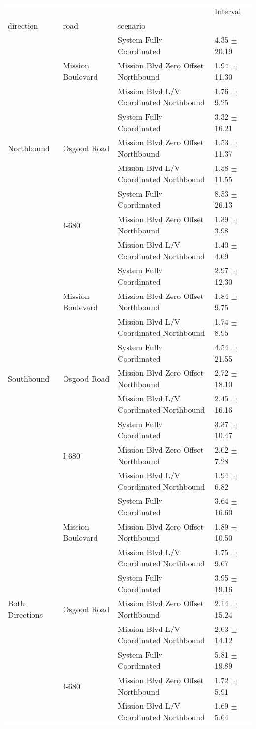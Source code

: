 \begin{tabular}{llll}
\toprule
 &  &  & Interval \\
direction & road & scenario &  \\
\midrule
\multirow[t]{9}{*}{Northbound} & \multirow[t]{3}{*}{Mission Boulevard} & System Fully Coordinated & 4.35 $\pm$ 20.19 \\
 &  & Mission Blvd Zero Offset Northbound & 1.94 $\pm$ 11.30 \\
 &  & Mission Blvd L/V Coordinated Northbound & 1.76 $\pm$ 9.25 \\
 & \multirow[t]{3}{*}{Osgood Road} & System Fully Coordinated & 3.32 $\pm$ 16.21 \\
 &  & Mission Blvd Zero Offset Northbound & 1.53 $\pm$ 11.37 \\
 &  & Mission Blvd L/V Coordinated Northbound & 1.58 $\pm$ 11.55 \\
 & \multirow[t]{3}{*}{I-680} & System Fully Coordinated & 8.53 $\pm$ 26.13 \\
 &  & Mission Blvd Zero Offset Northbound & 1.39 $\pm$ 3.98 \\
 &  & Mission Blvd L/V Coordinated Northbound & 1.40 $\pm$ 4.09 \\
\multirow[t]{9}{*}{Southbound} & \multirow[t]{3}{*}{Mission Boulevard} & System Fully Coordinated & 2.97 $\pm$ 12.30 \\
 &  & Mission Blvd Zero Offset Northbound & 1.84 $\pm$ 9.75 \\
 &  & Mission Blvd L/V Coordinated Northbound & 1.74 $\pm$ 8.95 \\
 & \multirow[t]{3}{*}{Osgood Road} & System Fully Coordinated & 4.54 $\pm$ 21.55 \\
 &  & Mission Blvd Zero Offset Northbound & 2.72 $\pm$ 18.10 \\
 &  & Mission Blvd L/V Coordinated Northbound & 2.45 $\pm$ 16.16 \\
 & \multirow[t]{3}{*}{I-680} & System Fully Coordinated & 3.37 $\pm$ 10.47 \\
 &  & Mission Blvd Zero Offset Northbound & 2.02 $\pm$ 7.28 \\
 &  & Mission Blvd L/V Coordinated Northbound & 1.94 $\pm$ 6.82 \\
\multirow[t]{9}{*}{Both Directions} & \multirow[t]{3}{*}{Mission Boulevard} & System Fully Coordinated & 3.64 $\pm$ 16.60 \\
 &  & Mission Blvd Zero Offset Northbound & 1.89 $\pm$ 10.50 \\
 &  & Mission Blvd L/V Coordinated Northbound & 1.75 $\pm$ 9.07 \\
 & \multirow[t]{3}{*}{Osgood Road} & System Fully Coordinated & 3.95 $\pm$ 19.16 \\
 &  & Mission Blvd Zero Offset Northbound & 2.14 $\pm$ 15.24 \\
 &  & Mission Blvd L/V Coordinated Northbound & 2.03 $\pm$ 14.12 \\
 & \multirow[t]{3}{*}{I-680} & System Fully Coordinated & 5.81 $\pm$ 19.89 \\
 &  & Mission Blvd Zero Offset Northbound & 1.72 $\pm$ 5.91 \\
 &  & Mission Blvd L/V Coordinated Northbound & 1.69 $\pm$ 5.64 \\
\bottomrule
\end{tabular}
